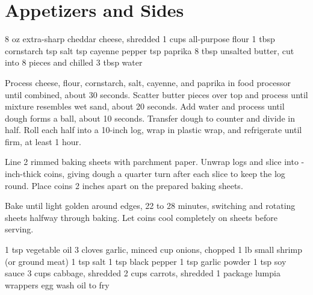 \chapter{Appetizers and Sides}

\vegetarian
\freezerfriendly
\begin{ingreds}
  8 oz extra-sharp cheddar cheese, shredded
  1  cups all-purpose flour
  1 tbsp cornstarch
   tsp salt
   tsp cayenne pepper
   tsp paprika
  8 tbsp unsalted butter, cut into 8 pieces and chilled
  3 tbsp water
\end{ingreds}

\begin{method}
  Process cheese, flour, cornstarch, salt, cayenne, and paprika
  in food processor until combined, about 30 seconds.
  Scatter butter pieces over top and process until
  mixture resembles wet sand, about 20 seconds.
  Add water and process until dough forms a ball, about 10 seconds.
  Transfer dough to counter and divide in half.
  Roll each half into a 10-inch log, wrap in plastic wrap,
  and refrigerate until firm, at least 1 hour.

  Line 2 rimmed baking sheets with parchment paper.
  Unwrap logs and slice into -inch-thick coins,
  giving dough a quarter turn after each slice
  to keep the log round.
  Place coins 2 inches apart on the prepared baking sheets.

  Bake until light golden around edges, 22 to 28 minutes,
  switching and rotating sheets halfway through baking.
  Let coins cool completely on sheets before serving.
\end{method}


\preptime{}
\cooktime{}
\freezerfriendly
\begin{ingreds}
  1 tsp vegetable oil
  3 cloves garlic, minced
   cup onions, chopped
  1 lb small shrimp (or ground meat)
  1 tsp salt
  1 tsp black pepper
  1 tsp garlic powder
  1 tsp soy sauce
  3 cups cabbage, shredded
  2 cups carrots, shredded
  1 package lumpia wrappers
  egg wash
  oil to fry
\end{ingreds}

